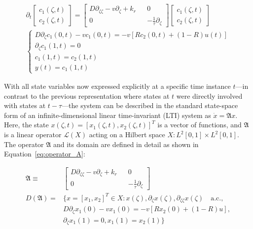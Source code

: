\begin{align}
    \partial_t 
    \begin{bmatrix}
        c_1(\zeta, t) \\ c_2(\zeta,t)
    \end{bmatrix}
    =
    \begin{bmatrix}
        D \partial_{\zeta \zeta} - v \partial_\zeta + k_r && 0 \\
        0 && -\frac{1}{\tau} \partial_\zeta
    \end{bmatrix}
    \begin{bmatrix}
        c_1(\zeta, t) \\ c_2(\zeta,t)
    \end{bmatrix}\\
\begin{cases}
    D \partial_\zeta c_1(0, t) - v c_1(0, t) = -v \left[ R c_2(0, t) + (1-R) u(t) \right] \\
    \partial_\zeta c_1(1, t) = 0 \\
    c_1(1,t) = c_2(1,t) \\
    y(t) = c_1(1, t)
\end{cases}
\end{align}

With all state variables now expressed explicitly at a specific time instance $t$—in contrast to the previous representation where states at $t$ were directly involved with states at $t-\tau$—the system can be described in the standard state-space form of an infinite-dimensional linear time-invariant (LTI) system as $\dot{x} = \mathfrak{A} x$. Here, the state $x(\zeta, t) = [x_1(\zeta, t), x_2(\zeta, t)]^T$ is a vector of functions, and $\mathfrak{A}$ is a linear operator $\mathcal{L}(X)$ acting on a Hilbert space $X: L^2[0,1] \times L^2[0,1]$. The operator $\mathfrak{A}$ and its domain are defined in detail as shown in Equation~\ref{eq:operator_A}:

\begin{equation} \label{eq:operator_A}
    \begin{aligned}
        \mathfrak{A} \equiv&
        \begin{bmatrix}
            D \partial_{\zeta \zeta} - v \partial_\zeta + k_r && 0 \\
            0 && -\frac{1}{\tau} \partial_\zeta
        \end{bmatrix}\\
        D(\mathfrak{A}) =& \{ x = [x_1, x_2]^T \in X:
        x(\zeta), \partial_\zeta x(\zeta), \partial_{\zeta \zeta} x(\zeta) \quad \mathrm{a.c.},\\
        &D \partial_\zeta x_1(0) - v x_1(0) = -v \left[ R x_2(0) + (1-R) u \right],\\
        &\partial_\zeta x_1(1) = 0,
        x_1(1) = x_2(1)\}
    \end{aligned}
\end{equation}

